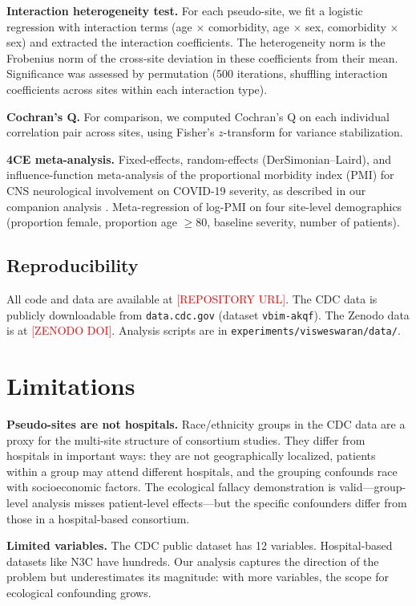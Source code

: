 \documentclass{article}
\begin{document}
\textbf{Interaction heterogeneity test.}  For each pseudo-site, we fit a
logistic regression with interaction terms (age $\times$ comorbidity,
age $\times$ sex, comorbidity $\times$ sex) and extracted the interaction
coefficients.  The heterogeneity norm is the Frobenius norm of the cross-site
deviation in these coefficients from their mean.  Significance was assessed by
permutation (500 iterations, shuffling interaction coefficients across sites
within each interaction type).

\textbf{Cochran's Q.}  For comparison, we computed Cochran's Q on each
individual correlation pair across sites, using Fisher's $z$-transform for
variance stabilization.

\textbf{4CE meta-analysis.}  Fixed-effects, random-effects (DerSimonian--Laird),
and influence-function meta-analysis of the proportional morbidity index (PMI)
for CNS neurological involvement on COVID-19 severity, as described in our
companion analysis \cite{four_ce_neuro2021}.  Meta-regression of log-PMI on
four site-level demographics (proportion female, proportion age $\geq 80$,
baseline severity, number of patients).


\subsection{Reproducibility}

All code and data are available at
\textcolor{red}{[REPOSITORY URL]}.  The CDC data is publicly downloadable from
\texttt{data.cdc.gov} (dataset \texttt{vbim-akqf}).  The Zenodo data is at
\textcolor{red}{[ZENODO DOI]}.  Analysis scripts are in
\texttt{experiments/visweswaran/data/}.


\section{Limitations}

\textbf{Pseudo-sites are not hospitals.}  Race/ethnicity groups in the CDC
data are a proxy for the multi-site structure of consortium studies.  They
differ from hospitals in important ways: they are not geographically
localized, patients within a group may attend different hospitals, and the
grouping confounds race with socioeconomic factors.  The ecological fallacy
demonstration is valid---group-level analysis misses patient-level
effects---but the specific confounders differ from those in a hospital-based
consortium.

\textbf{Limited variables.}  The CDC public dataset has 12 variables.
Hospital-based datasets like N3C have hundreds.  Our analysis captures the
direction of the problem but underestimates its magnitude: with more
variables, the scope for ecological confounding grows.
\end{document}
